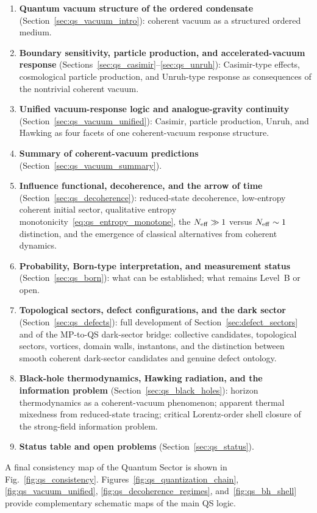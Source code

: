 \begin{enumerate}[label=(\arabic*)]
    for spinorial excitations~(Level~B); Pauli exclusion
    as conditional consequence.
  \item \textbf{Quantum vacuum structure of the ordered condensate}
    (Section~\ref{sec:qs_vacuum_intro}):
    coherent vacuum as a structured ordered medium.
  \item \textbf{Boundary sensitivity, particle production,
    and accelerated-vacuum response}
    (Sections~\ref{sec:qs_casimir}--\ref{sec:qs_unruh}):
    Casimir-type effects, cosmological particle production,
    and Unruh-type response as consequences of the nontrivial
    coherent vacuum.
  \item \textbf{Unified vacuum-response logic and analogue-gravity
    continuity}
    (Section~\ref{sec:qs_vacuum_unified}):
    Casimir, particle production, Unruh, and Hawking as four facets
    of one coherent-vacuum response structure.
  \item \textbf{Summary of coherent-vacuum predictions}
    (Section~\ref{sec:qs_vacuum_summary}).
  \item \textbf{Influence functional, decoherence, and the
    arrow of time}
    (Section~\ref{sec:qs_decoherence}):
    reduced-state decoherence, low-entropy coherent initial sector,
    qualitative entropy monotonicity~\eqref{eq:qs_entropy_monotone},
    the $N_{\rm eff}\gg1$ versus $N_{\rm eff}\sim1$ distinction,
    and the emergence of classical alternatives from coherent dynamics.
  \item \textbf{Probability, Born-type interpretation, and
    measurement status}
    (Section~\ref{sec:qs_born}):
    what can be established; what remains Level~B or open.
  \item \textbf{Topological sectors, defect configurations, and
    the dark sector}
    (Section~\ref{sec:qs_defects}):
    full development of Section~\ref{sec:defect_sectors} and of the
    MP-to-QS dark-sector bridge: collective candidates, topological
    sectors, vortices, domain walls, instantons, and the distinction
    between smooth coherent dark-sector candidates and genuine defect
    ontology.
  \item \textbf{Black-hole thermodynamics, Hawking radiation, and
    the information problem}
    (Section~\ref{sec:qs_black_holes}):
    horizon thermodynamics as a coherent-vacuum phenomenon; apparent
    thermal mixedness from reduced-state tracing; critical Lorentz-order
    shell closure of the strong-field information problem.
  \item \textbf{Status table and open problems}
    (Section~\ref{sec:qs_status}).
\end{enumerate}
A final consistency map of the Quantum Sector is shown in
Fig.~\ref{fig:qs_consistency}.
Figures~\ref{fig:qs_quantization_chain}, \ref{fig:qs_vacuum_unified},
\ref{fig:qs_decoherence_regimes}, and~\ref{fig:qs_bh_shell}
provide complementary schematic maps of the main QS logic.

